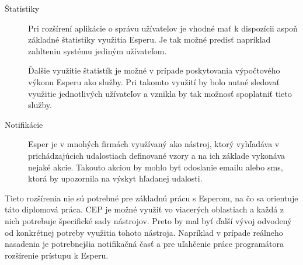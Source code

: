 \begin{description}
		\item[Štatistiky]
		Pri rozšírení aplikácie o správu užívateľov je vhodné mať k dispozícii aspoň základné štatistiky využitia Esperu. Je tak možné predísť napríklad zahlteniu systému jediným užívateľom.
		
		Ďalšie využitie štatistík je možné v prípade poskytovania výpočtového výkonu Esperu ako služby. Pri takomto využití by bolo nutné sledovať využitie jednotlivých užívateľov a vznikla by tak možnosť spoplatniť tieto služby.
		
		\item[Notifikácie] 
		Esper je v mnohých firmách využívaný ako nástroj, ktorý vyhľadáva v prichádzajúcich udalostiach definované vzory a na ich základe vykonáva nejaké akcie. Takouto akciou by mohlo byť odoslanie emailu alebo sms, ktorá by upozornila na výskyt hľadanej udalosti.
	\end{description}

	Tieto rozšírenia nie sú potrebné pre základnú prácu s Esperom, na čo sa orientuje táto diplomová práca. CEP je možné využiť vo viacerých oblastiach a každá z nich potrebuje špecifické sady nástrojov. Preto by mal byť ďalší vývoj odvodený od konkrétnej potreby využitia tohoto nástroja. Napríklad v prípade reálneho nasadenia je potrebnejšia notifikačná časť a pre uľahčenie práce programátora rozšírenie prístupu k Esperu.